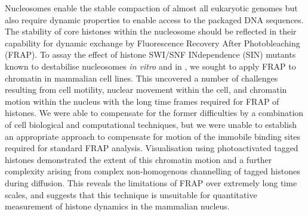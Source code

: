 
  \begin{chapterabstract}
    Nucleosomes enable the stable compaction of almost all eukaryotic
    genomes but also require dynamic properties to enable access to
    the packaged DNA sequences.  The stability of core histones within the
    nucleosome should be reflected in their capability for dynamic exchange by
    Fluorescence Recovery After Photobleaching (FRAP).  To assay the
    effect of histone SWI/SNF INdependence (SIN)
    mutants known to destabilise nucleosomes
    \textit{in vitro} and in , we sought to
    apply FRAP to chromatin in mammalian cell lines.  This uncovered a
    number of challenges resulting from cell motility, nuclear movement
    within the cell, and chromatin motion within the nucleus with the
    long time frames required for FRAP of histones.  We were able to
    compensate for the former difficulties by a combination of cell
    biological and computational techniques, but we were unable to
    establish an appropriate approach to compensate for motion of the immobile
    binding sites required for standard FRAP analysis.
    Visualisation using photoactivated tagged histones
    demonstrated the extent of this chromatin motion
    and a further complexity arising from complex
    non-homogenous channelling of tagged histones
    during diffusion.  This reveals the
    limitations of FRAP over extremely long time scales, and suggests
    that this technique is unsuitable for quantitative measurement of
    histone dynamics in the mammalian nucleus.
  \end{chapterabstract}

  
  
  
  

